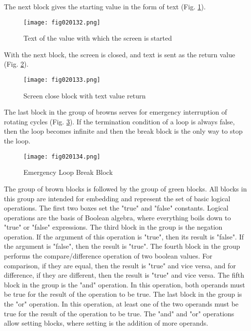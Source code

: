 The next block gives the starting value in the form of text (Fig. \ref{fig020132}).

\begin{figure}[H]
   \centering
   \texttt{[image: fig020132.png]}
   \caption{Text of the value with which the screen is started}
\label{fig020132}
\end{figure}

With the next block, the screen is closed, and text is sent as the return value (Fig. \ref{fig020133}).

\begin{figure}[H]
   \centering
   \texttt{[image: fig020133.png]}
   \caption{Screen close block with text value return}
\label{fig020133}
\end{figure}

The last block in the group of browns serves for emergency interruption of rotating cycles (Fig. \ref{fig020134}). If the termination condition of a loop is always false, then the loop becomes infinite and then the break block is the only way to stop the loop.

\begin{figure}[H]
   \centering
   \texttt{[image: fig020134.png]}
   \caption{Emergency Loop Break Block}
\label{fig020134}
\end{figure}

The group of brown blocks is followed by the group of green blocks. All blocks in this group are intended for embedding and represent the set of basic logical operations. The first two boxes set the "true" and "false" constants. Logical operations are the basis of Boolean algebra, where everything boils down to "true" or "false" expressions. The third block in the group is the negation operation. If the argument of this operation is "true", then its result is "false". If the argument is "false", then the result is "true". The fourth block in the group performs the compare/difference operation of two boolean values. For comparison, if they are equal, then the result is "true" and vice versa, and for difference, if they are different, then the result is "true" and vice versa. The fifth block in the group is the "and" operation. In this operation, both operands must be true for the result of the operation to be true. The last block in the group is the "or" operation. In this operation, at least one of the two operands must be true for the result of the operation to be true. The "and" and "or" operations allow setting blocks, where setting is the addition of more operands.

